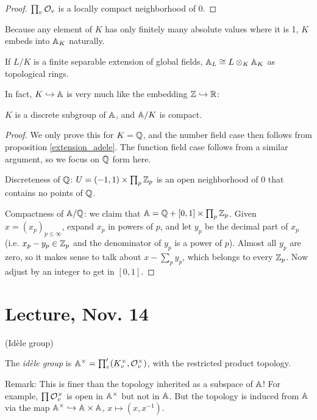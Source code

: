 \documentclass[11pt]{amsart}
\begin{document}
\begin{proof}
$\prod_v \cO_v$ is a locally compact neighborhood of $0$.
\end{proof}


Because any element of $K$ has only finitely many absolute values where it is 1, $K$ embeds into $\AA_K$ naturally.

\begin{prop}
\label{extension_adele}
If $L/K$ is a finite separable extension of global fields, $\AA_L \cong L\otimes_K \AA_K$ as topological rings.
\end{prop}

In fact, $K\into \AA$ is very much like the embedding $\ZZ\into \RR$:

\begin{thm}
$K$ is a discrete subgroup of $\AA$, and $\AA/K$ is compact.
\end{thm}


\begin{proof}
We only prove this for $K = \QQ$, and the number field case then follows from proposition \ref{extension_adele}. The function field case follows from a similar argument, so we focus on $\QQ$ form here.

Discreteness of $\QQ$: $U = (-1,1)\times \prod_p \ZZ_p$ is an open neighborhood of 0 that contains no points of $\QQ$.

Compactness of $\AA/\QQ$: we claim that $\AA = \QQ + [0,1]\times \prod_p \ZZ_p$. Given $x = (x_p)_{p\le \infty}$, expand $x_p$ in powers of $p$, and let $y_p$ be the decimal part of $x_p$ (i.e. $x_p-y_p\in \ZZ_p$ and the denominator of $y_p$ is a power of $p$). Almost all $y_p$ are zero, so it makes sense to talk about $x - \sum_p y_p$, which belongs to every $\ZZ_p$. Now adjust by an integer to get in $[0,1]$.
\end{proof}


\section{Lecture, Nov. 14}

(Id\`ele group)

\begin{defn}
The \emph{id\`ele group} is $\AA^{\times} = \prod_v' (K_v^{\times}, \cO_v^{\times})$, with the restricted product topology.
\end{defn}


Remark:
This is finer than the topology inherited as a subspace of $\AA$! For example, $\prod \cO_v^{\times}$ is open in $\AA^{\times}$ but not in $\AA$. But the topology is induced from $\AA$ via the map $\AA^{\times} \into \AA\times \AA$, $x\mapsto (x, x^{-1})$.
\end{document}
